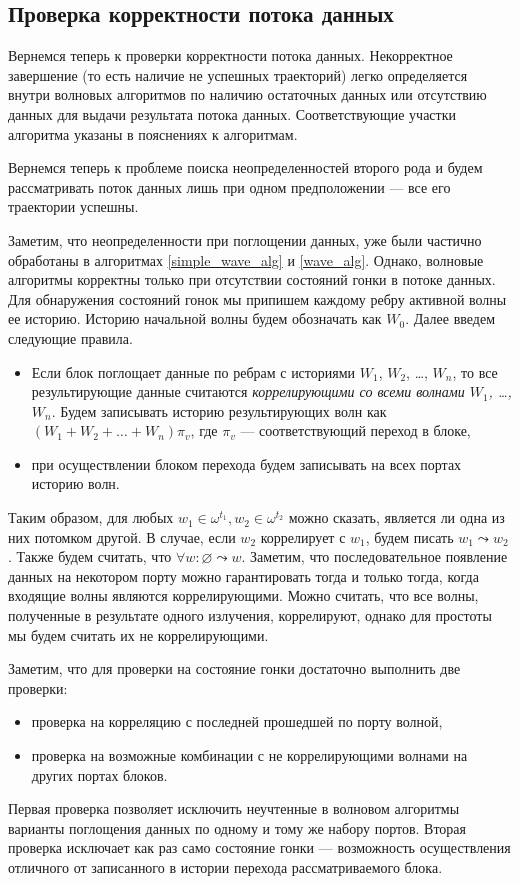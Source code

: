 \documentclass[10pt,a4paper]{article}
\begin{document}
\subsection{Проверка корректности потока данных}
  Вернемся теперь к проверки корректности потока данных.
  Некорректное завершение (то есть наличие не успешных траекторий) легко определяется внутри волновых алгоритмов
  по наличию остаточных данных или отсутствию данных для выдачи результата потока данных. Соответствующие участки алгоритма указаны в пояснениях к алгоритмам.
  
  Вернемся теперь к проблеме поиска неопределенностей второго рода и будем рассматривать поток данных лишь при одном предположении --- все его траектории успешны.
  
  Заметим, что неопределенности при поглощении данных, уже были частично обработаны в алгоритмах \ref{simple_wave_alg} и \ref{wave_alg}.
  Однако, волновые алгоритмы корректны только при отсутствии состояний гонки в потоке данных.
  Для обнаружения состояний гонок мы припишем каждому ребру активной волны ее историю.
  Историю начальной волны будем обозначать как $W_0$. Далее введем следующие правила.
  \begin{itemize}
    \item Если блок поглощает данные по ребрам с историями $W_1$, $W_2$, \dots, $W_n$, то
    все результирующие данные считаются \textit{коррелирующими со всеми волнами $W_1$, \dots, $W_n$}. Будем записывать историю результирующих волн как $(W_1 + W_2 + \dots + W_n) \pi_v$,
    где $\pi_v$ --- соответствующий переход в блоке,
    \item при осуществлении блоком перехода будем записывать на всех портах историю волн.
  \end{itemize}
  
  Таким образом, для любых $w_1 \in \omega^{t_1}, w_2 \in \omega^{t_2}$ можно сказать, является ли одна из них потомком другой.
  В случае, если $w_2$ коррелирует с $w_1$, будем писать $w_1 \leadsto w_2$. Также будем считать, что $\forall w: \varnothing \leadsto w$.
  Заметим, что последовательное появление данных на некотором порту можно гарантировать тогда и только тогда, когда входящие волны являются коррелирующими.
  Можно считать, что все волны, полученные в результате одного излучения, коррелируют, однако для простоты мы будем считать их не коррелирующими.
  
  Заметим, что для проверки на состояние гонки достаточно выполнить две проверки:
  \begin{itemize}
    \item проверка на корреляцию с последней прошедшей по порту волной,
    \item проверка на возможные комбинации с не коррелирующими волнами на других портах блоков.
  \end{itemize}
  Первая проверка позволяет исключить неучтенные в волновом алгоритмы варианты поглощения данных по одному и тому же набору портов.
  Вторая проверка исключает как раз само состояние гонки --- возможность осуществления отличного от записанного в истории перехода рассматриваемого блока.
  
\end{document}
